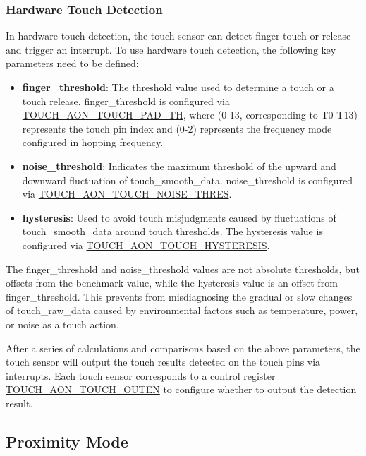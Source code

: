 \documentclass[main\_\_EN.tex]{subfiles}
\begin{document}
\subsubsection{Hardware Touch Detection}

In hardware touch detection, the touch sensor can detect finger touch or release and trigger an interrupt. To use hardware touch detection, the following key parameters need to be defined:

\begin{itemize}
    \item \textbf{finger\_threshold}: The threshold value used to determine a touch or a touch release. finger\_threshold is configured via \hyperref[fielddesc:TOUCHAONTOUCHPAD0TH0]{TOUCH\_AON\_TOUCH\_PAD\_TH}, where  (0-13, corresponding to T0-T13) represents the touch pin index and  (0-2) represents the frequency mode configured in hopping frequency.

    \item \textbf{noise\_threshold}: Indicates the maximum threshold of the upward and downward fluctuation of touch\_smooth\_data. noise\_threshold is configured via \hyperref[fielddesc:TOUCHAONTOUCHNOISETHRES]{TOUCH\_AON\_TOUCH\_NOISE\_THRES}.
    
    \item \textbf{hysteresis}: Used to avoid touch misjudgments caused by fluctuations of touch\_smooth\_data around touch thresholds. The hysteresis value is configured via \hyperref[fielddesc:TOUCHAONTOUCHHYSTERESIS]{TOUCH\_AON\_TOUCH\_HYSTERESIS}.

\end{itemize}

The finger\_threshold and noise\_threshold values are not absolute thresholds, but offsets from the benchmark value, while the hysteresis value is an offset from finger\_threshold. This prevents from misdiagnosing the gradual or slow changes of touch\_raw\_data caused by environmental factors such as temperature, power, or noise as a touch action.

After a series of calculations and comparisons based on the above parameters, the touch sensor will output the touch results detected on the touch pins via interrupts. Each touch sensor corresponds to a control register \hyperref[fielddesc:TOUCHAONTOUCHOUTEN]{TOUCH\_AON\_TOUCH\_OUTEN} to configure whether to output the detection result.

\subsection{Proximity Mode}
\end{document}
